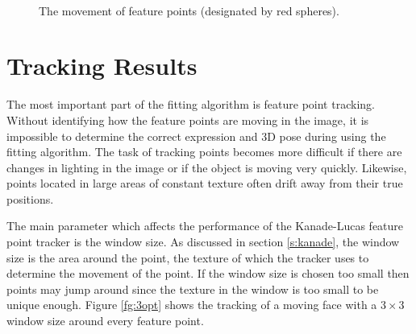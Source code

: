 \documentclass[11pt,a4paper]{report}
\begin{document}
\begin{figure}[H]
\centering
{}\\

\caption{The movement of feature points (designated by red spheres).}\label{fg:featureinter}
\end{figure}



\section{Tracking Results}
The most important part of the fitting algorithm is feature point
tracking. Without identifying how the feature points are moving in the image, it
is impossible to determine the correct expression and 3D pose during using the
fitting algorithm. The task of tracking points becomes more difficult if there
are changes in lighting in the image or if the object is moving very
quickly. Likewise, points located in large areas of constant texture often drift
away from their true positions. 

The main parameter which affects the performance of the Kanade-Lucas feature
point tracker is the window size. As discussed in section \ref{s:kanade}, the
window size is the area around the point, the texture of which the tracker uses
to determine the movement of the point. If the window size is chosen too small
then points may jump around since the texture in the window is too small to be
unique enough. Figure \ref{fg:3opt} shows the tracking of a moving face with
a $3 \times 3$ window size around every feature point.
\end{document}
